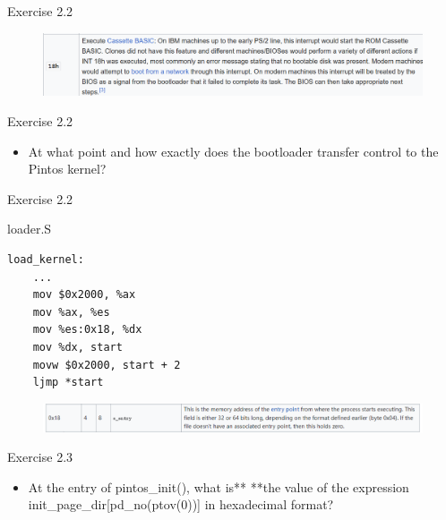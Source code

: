 \documentclass[14pt]{beamer}
\begin{document}
\begin{frame}[fragile]{Exercise 2.2}
    \begin{figure}
        \centering
        \includegraphics[width=\linewidth]{figure/NotFound.png}

    \end{figure}
\end{frame}
\begin{frame}[fragile]{Exercise 2.2}
\begin{itemize}
    \item At what point and how exactly does the bootloader transfer control to the Pintos kernel?
\end{itemize}

\end{frame}
\begin{frame}[fragile]{Exercise 2.2}
    \begin{block}{loader.S}
        \begin{lstlisting}[language={[x86masm]Assembler}]
load_kernel:
    ...
    mov $0x2000, %ax
    mov %ax, %es
    mov %es:0x18, %dx
    mov %dx, start
    movw $0x2000, start + 2
    ljmp *start
        \end{lstlisting}
    \end{block}
\begin{figure}
    \centering
    \includegraphics[width=\linewidth]{figure/ELF0x18.png}

\end{figure}
\end{frame}
\begin{frame}[fragile]{Exercise 2.3}
\begin{itemize}
    \item At the entry of pintos\_init(), what is** **the value of the expression init\_page\_dir[pd\_no(ptov(0))] in hexadecimal format?
\end{itemize}
\end{frame}
\end{document}
